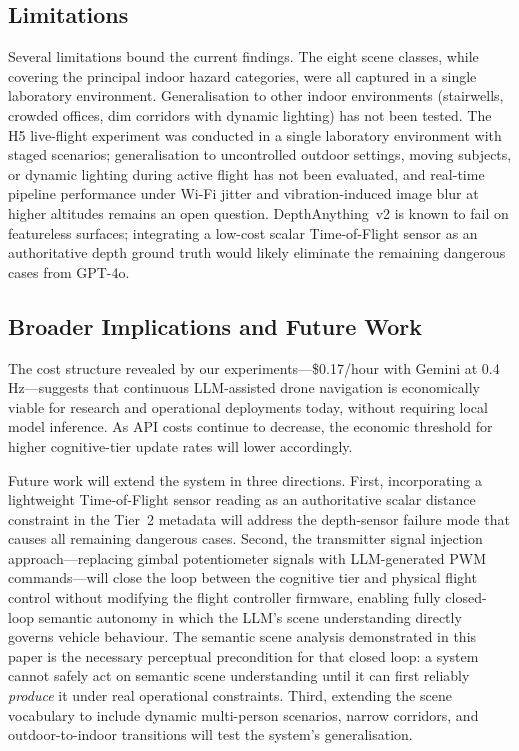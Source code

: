 \documentclass[journal]{IEEEtran}
\begin{document}
\subsection{Limitations}

Several limitations bound the current findings.
The eight scene classes, while covering the principal indoor hazard
categories, were all captured in a single laboratory environment.
Generalisation to other indoor environments (stairwells, crowded offices,
dim corridors with dynamic lighting) has not been tested.
The H5 live-flight experiment was conducted in a single laboratory environment
with staged scenarios; generalisation to uncontrolled outdoor settings,
moving subjects, or dynamic lighting during active flight has not been
evaluated, and real-time pipeline performance under Wi-Fi jitter and
vibration-induced image blur at higher altitudes remains an open question.
DepthAnything~v2 is known to fail on featureless surfaces; integrating
a low-cost scalar Time-of-Flight sensor as an authoritative depth ground
truth would likely eliminate the remaining dangerous cases from GPT-4o.

\subsection{Broader Implications and Future Work}

The cost structure revealed by our experiments---\$0.17/hour with
Gemini at 0.4\,Hz---suggests that continuous LLM-assisted drone
navigation is economically viable for research and operational
deployments today, without requiring local model inference.
As API costs continue to decrease, the economic threshold for higher
cognitive-tier update rates will lower accordingly.

Future work will extend the system in three directions.
First, incorporating a lightweight Time-of-Flight sensor reading as an
authoritative scalar distance constraint in the Tier~2 metadata will
address the depth-sensor failure mode that causes all remaining dangerous
cases.
Second, the transmitter signal injection approach---replacing gimbal
potentiometer signals with LLM-generated PWM commands---will close the
loop between the cognitive tier and physical flight control without
modifying the flight controller firmware, enabling fully closed-loop
semantic autonomy in which the LLM's scene understanding directly
governs vehicle behaviour.
The semantic scene analysis demonstrated in this paper is the necessary
perceptual precondition for that closed loop: a system cannot safely
act on semantic scene understanding until it can first reliably
\emph{produce} it under real operational constraints.
Third, extending the scene vocabulary to include dynamic multi-person
scenarios, narrow corridors, and outdoor-to-indoor transitions will
test the system's generalisation.
\end{document}
